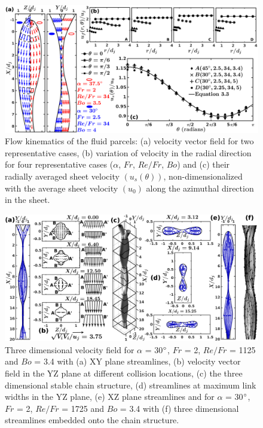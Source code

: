 \documentclass{jfm}
\begin{document}
\begin{figure}
	\centering
	\includegraphics[width=\linewidth]{Figure4}
	\caption{Flow kinematics of the fluid parcels: (a) velocity vector field for two representative cases, (b) variation of velocity in the radial direction for four representative cases ($\alpha$, $Fr$, $Re/Fr$, $Bo$) and (c) their radially averaged sheet velocity $\left(u_s(\theta)\right)$, non-dimensionalized with the average sheet velocity $\left(u_0\right)$ along the azimuthal direction in the sheet.}
	\label{Figure::velocityVectors}%
\end{figure}
\begin{figure}
	\centering
	\includegraphics[width=\linewidth]{Figure5}
	\caption{Three dimensional velocity field for $\alpha$ = 30$\degree$, $Fr$ = 2,  $Re/Fr$ = 1125 and $Bo$ = 3.4 with (a) XY plane streamlines, (b) velocity vector field in the YZ plane at different collision locations, (c) the three dimensional stable chain structure, (d) streamlines at maximum link widths in the YZ plane, (e) XZ plane streamlines and for $\alpha$ = 30$\degree$, $Fr$ = 2,  $Re/Fr$ = 1725 and $Bo$ = 3.4 with (f) three dimensional streamlines embedded onto the chain structure.}
	\label{Figure::streamDetails}%
\end{figure}
\end{document}
